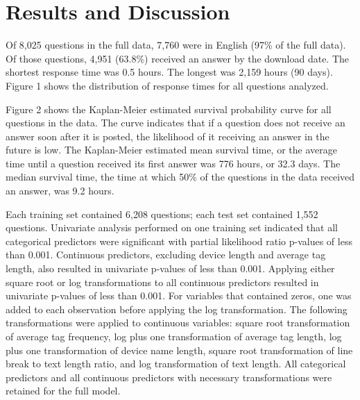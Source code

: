 \documentclass[]{interact}\usepackage[]{graphicx}\usepackage[]{color}
\begin{document}
{\section{Results and Discussion}



% 

  Of 8,025 questions in the full data, 7,760 were in English (97\% of the full data). Of those questions, 4,951 (63.8\%) received an answer by the download date. The shortest response time was 0.5 hours. The longest was 2,159 hours (90 days). Figure 1 shows the distribution of response times for all questions analyzed. 



Figure 2 shows the Kaplan-Meier estimated survival probability curve for all questions in the data. The curve indicates that if a question does not receive an answer soon after it is posted, the likelihood of it receiving an answer in the future is low. The Kaplan-Meier estimated mean survival time, or the average time until a question received its first answer was 776 hours, or 32.3 days. The median survival time, the time at which 50\% of the questions in the data received an answer, was 9.2 hours.




Each training set contained 6,208 questions; each test set contained 1,552 questions. Univariate analysis performed on one training set indicated that all categorical predictors were significant with partial likelihood ratio p-values of less than 0.001. Continuous predictors, excluding device length and average tag length, also resulted in univariate p-values of less than 0.001. Applying either square root or log transformations to all continuous predictors resulted in univariate p-values of less than 0.001. For variables that contained zeros, one was added to each observation before applying the log transformation. The following transformations were applied to continuous variables: square root transformation of average tag frequency, log plus one transformation of average tag length, log plus one transformation of device name length, square root transformation of line break to text length ratio, and log transformation of text length. All categorical predictors and all continuous predictors with necessary transformations were retained for the full model. 

}
\end{document}
